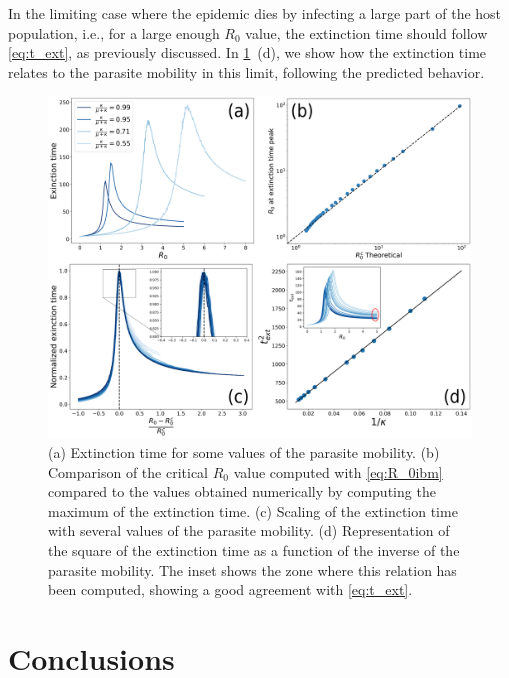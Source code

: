 In the limiting case where the epidemic dies by infecting a large part of
the host population, i.e., for a large enough $R_0$ value, the extinction time
should follow \cref{eq:t_ext}, as previously discussed. In
\cref{fig:extinction_time}~\textcolor{ref_color}{(d)}, we show how the
extinction time relates to the
parasite mobility in this limit, following the predicted behavior.

\begin{figure}[H]
    \centering
    \includegraphics[width=\textwidth]{Figures/Extinction_time.png}
    \caption[Analysis of the extinction time of the epidemic]{(a) Extinction
        time for some values of the parasite mobility. (b) Comparison of the
        critical $R_0$ value computed with \cref{eq:R_0ibm} compared to the
        values obtained numerically by computing the maximum of the extinction
        time. (c) Scaling of the extinction time with several values of the
        parasite mobility. (d) Representation of the square of the extinction
        time as a function of the inverse of the parasite mobility. The inset
        shows the zone where this relation has been computed, showing a good
        agreement with \cref{eq:t_ext}.}
    \label{fig:extinction_time}
\end{figure}

\section{Conclusions} \label{sec: conclusions}

